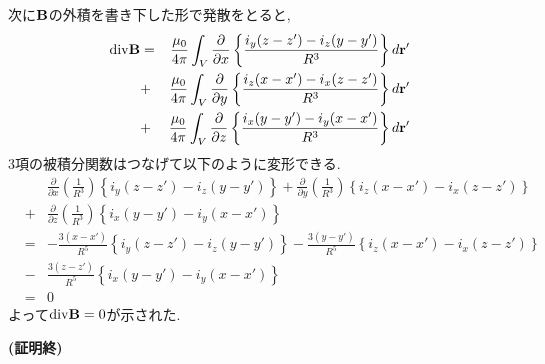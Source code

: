 \documentclass[../main]{subfiles}
\begin{document}
次に${\bf B}$の外積を書き下した形で発散をとると,
\begin{eqnarray*}
{\rm div}{\bf B}&=&\frac{\mu_0}{4 \pi}  \int_{V}^{} \frac{\partial}{\partial x}\left\{ \frac{i_y(z-z')-i_z(y-y')}{R^3} \right\} d{\bf r'} \\
&+&\frac{\mu_0}{4 \pi}  \int_{V}^{} \frac{\partial}{\partial y} \left\{ \frac{i_z(x-x')-i_x(z-z')}{R^3} \right\} d{\bf r'} \\
&+&\frac{\mu_0}{4 \pi}  \int_{V}^{} \frac{\partial}{\partial z} \left\{ \frac{i_x(y-y')-i_y(x-x')}{R^3} \right\} d{\bf r'} \\
\end{eqnarray*}
3項の被積分関数はつなげて以下のように変形できる. \\
\begin{eqnarray*}
&\ & \frac{\partial}{\partial x}\left( \frac{1}{R^3} \right) \left\{i_y(z-z')-i_z(y-y')\right\} + \frac{\partial}{\partial y}\left( \frac{1}{R^3} \right) \left\{i_z(x-x')-i_x(z-z')\right\} \\
&+& \frac{\partial}{\partial z}\left( \frac{1}{R^3} \right) \left\{i_x(y-y')-i_y(x-x')\right\} \\
&=&-\frac{3(x-x')}{R^5} \left\{i_y(z-z')-i_z(y-y')\right\} - \frac{3(y-y')}{R^5} \left\{i_z(x-x')-i_x(z-z')\right\} \\
&-& \frac{3(z-z')}{R^5} \left\{i_x(y-y')-i_y(x-x')\right\} \\
&=& 0
\end{eqnarray*}
よって${\rm div}{\bf B}=0$が示された. \\
\begin{flushright}
{\bf (証明終)}
\end{flushright}
\end{document}
